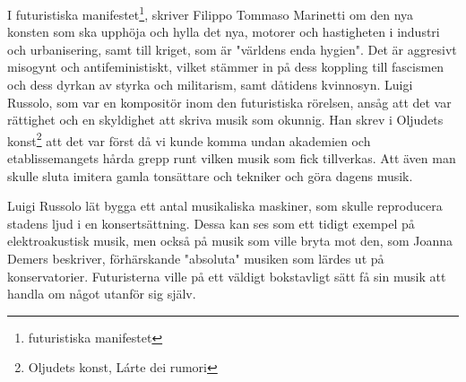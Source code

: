 \documentclass{article}
\begin{document}


I futuristiska manifestet\footnote{futuristiska manifestet}, skriver Filippo Tommaso Marinetti om den nya
konsten som ska upphöja och hylla det nya, motorer och hastigheten i industri och urbanisering, samt till
kriget, som är "världens enda hygien". Det är aggresivt misogynt och antifeministiskt, vilket stämmer in på
dess koppling till fascismen och dess dyrkan av styrka och militarism, samt dåtidens kvinnosyn.
Luigi Russolo, som var en kompositör inom den futuristiska rörelsen, ansåg att det var rättighet och en
skyldighet att skriva musik som okunnig. Han skrev i Oljudets konst\footnote{Oljudets konst, Lárte dei
rumori} att det var först då vi kunde komma undan akademien och etablissemangets hårda grepp runt vilken
musik som fick tillverkas. Att även man skulle sluta imitera gamla tonsättare och tekniker och göra dagens
musik.






Luigi Russolo lät bygga ett antal musikaliska maskiner, som skulle reproducera stadens ljud i en
konsertsättning. Dessa kan ses som ett tidigt exempel på elektroakustisk musik, men också på musik som ville
bryta mot den, som Joanna Demers beskriver, förhärskande "absoluta" musiken som lärdes ut på
konservatorier. Futuristerna ville på ett väldigt bokstavligt sätt få sin musik att handla om något utanför
sig själv. 





\end{document}
